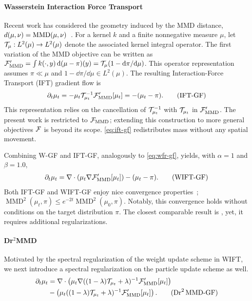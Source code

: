 \paragraph{Wasserstein Interaction Force Transport}
Recent work has considered the geometry induced by the MMD distance, $d(\mu,\nu)=\operatorname{MMD}(\mu,\nu)$~\citep{zhu2024inclusive,zhu2024kernel,gladin2024interaction}. For a kernel $k$ and a finite nonnegative measure $\mu$, let $\mathcal{T}_\mu:L^2(\mu)\to L^2(\mu)$ denote the associated kernel integral operator. The first variation of the MMD objective can be written as $\mathcal{F}'_{\operatorname{MMD}}=\int k(\cdot,y)\,\mathrm{d}(\mu-\pi)(y)=\mathcal{T}_\mu(1-\mathrm{d}\pi/\mathrm{d}\mu)$. This operator representation assumes $\pi\ll\mu$ and $1-\dd\pi/\dd\mu\in L^2(\mu)$. The resulting Interaction-Force Transport (IFT) gradient flow is~\citep{gladin2024interaction}
\begin{align*}\label{eq:ift-gf}
\partial_t\mu_t = -\mu_t \mathcal{T}_{\mu_t}^{-1} \mathcal{F}_{\operatorname{MMD}}'[\mu_t] = -(\mu_t - \pi). \tag{IFT-GF}
\end{align*}
This representation relies on the cancellation of $\mathcal{T}_{\mu_t}^{-1}$ with $\mathcal{T}_{\mu_t}$ in $\mathcal{F}_{\operatorname{MMD}}'$. The present work is restricted to $\mathcal{F}_{\operatorname{MMD}}$; extending this construction to more general objectives $\mathcal{F}$ is beyond its scope. \eqref{eq:ift-gf} redistributes mass without any spatial movement. 

Combining W-GF and IFT-GF, analogously to \eqref{eq:wfr-gf}, yields, with $\alpha=1$ and $\beta=1.0$,
\begin{align*}
    \partial_t\mu_t = \nabla\cdot \left(\mu_t \nabla \mathcal{F}_{\operatorname{MMD}}'[\mu_t]\right) - (\mu_t - \pi) . \tag{WIFT-GF}
\end{align*}
Both IFT-GF and WIFT-GF enjoy nice convergence properties~\citep{gladin2024interaction}; $\operatorname{MMD}^2(\mu_t,\pi)\leq e^{-2t}\operatorname{MMD}^2(\mu_0,\pi)$. Notably, this convergence holds without conditions on the target distribution $\pi$. The closest comparable result is \citet[Theorem 4.1]{tian2026sobolev}, yet, it requires additional regularizations.


\paragraph{Dr$^2$MMD} 
Motivated by the spectral regularization of the weight update scheme in WIFT, we next introduce a spectral regularization on the particle update scheme as well. 
\begin{align*}
    \partial_t\mu_t &= \nabla\cdot \left(\mu_t \nabla ((1-\lambda) \calT_{\mu_t} + \lambda)^{-1} \calF_{\mmd}'[\mu_t]\right)\\
    &- \left( \mu_t ((1-\lambda) \calT_{\mu_t} + \lambda)^{-1} \calF_{\mmd}'[\mu_t]\right) . \tag{$\mathrm{Dr}^{2}\,\mathrm{MMD}$-GF}
\end{align*}




